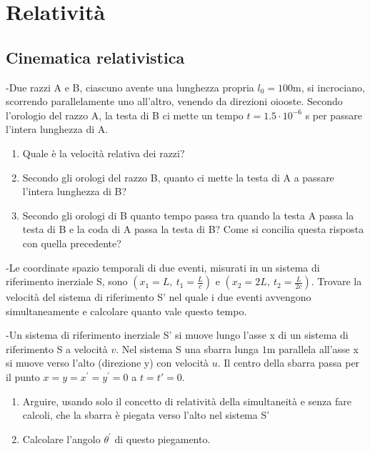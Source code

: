 \documentclass[12pt,twoside,a4]{article}
\begin{document}
\section{Relatività }
\subsection{Cinematica relativistica}

\begin{esercizio}
	-Due razzi A e B, ciascuno avente una lunghezza propria $l_0 = 100$m, si incrociano, scorrendo parallelamente uno all'altro, venendo da direzioni oiooste. Secondo l'orologio del razzo A, la testa di B ci mette un tempo $t = 1.5 \cdot 10^{-6}$ s per passare l'intera lunghezza di A.
	\begin{enumerate}[label=(\textit{\roman*})]
		\item Quale è la velocità  relativa dei razzi?
		\item Secondo gli orologi del razzo B, quanto ci mette la testa di A a passare l'intera lunghezza di B?
		\item Secondo gli orologi di B quanto tempo passa tra quando la testa A passa la testa di B e la coda di A passa la testa di B? Come si concilia questa risposta con quella precedente?
	\end{enumerate}
\end{esercizio}

\begin{esercizio}
	-Le coordinate spazio temporali di due eventi, misurati in un sistema di riferimento inerziale S, sono $(x_1=L, \ t_1 = \frac{L}{c})$ e $(x_2=2L,\  t_2 = \frac{L}{2c})$. Trovare la velocità  del sistema di riferimento S' nel quale i due eventi avvengono simultaneamente e calcolare quanto vale questo tempo.
\end{esercizio}

\begin{esercizio}
	-Un sistema di riferimento inerziale S' si muove lungo l'asse x di un sistema di riferimento S a velocità  $v$. Nel sistema S una sbarra lunga $1$m parallela all'asse x si muove verso l'alto (direzione y) con velocità  $u$. Il centro della sbarra passa per il punto $x=y=x^\prime =y^\prime =0$ a $t=t' =0.$
	\begin{enumerate}[label=(\textit{\roman*})]
		\item Arguire, usando solo il concetto di relatività  della simultaneità  e senza fare calcoli, che la sbarra è piegata verso l'alto nel sistema S'
		\item Calcolare l'angolo $\theta ^\prime$ di questo piegamento.
	\end{enumerate}
\end{esercizio}
\end{document}
